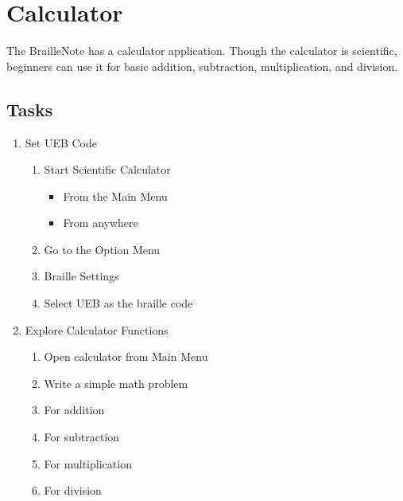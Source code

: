\documentclass[10pt,letterpaper,twoside]{report}
\begin{document}
{\clearpage
\section{Calculator}
The BrailleNote has a calculator application. Though the calculator is scientific, beginners can use it for basic addition, subtraction, multiplication, and division.
\subsection{Tasks}
\begin{enumerate}
	\item Set UEB Code
	      \begin{enumerate}\item Start Scientific Calculator
		            \begin{itemize}
			            \item From the Main Menu 
			            \item From anywhere 
		            \end{itemize}
		      \item Go to the Option Menu 
		      \item Braille Settings 
		      \item Select UEB as the braille code 
	      \end{enumerate}
	\item Explore Calculator Functions
	      \begin{enumerate}
		      \item Open calculator from Main Menu 
		      \item Write a simple math problem
		      \item For addition 
		      \item For subtraction 
		      \item For multiplication 
		      \item For division 

\end{enumerate}
\end{enumerate}}
\end{document}
